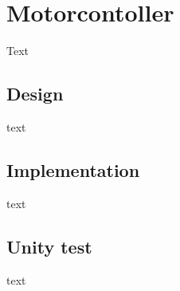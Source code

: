 \section{Motorcontoller}
Text

\subsection{Design}
text

\subsection{Implementation}
text

\subsection{Unity test}
text